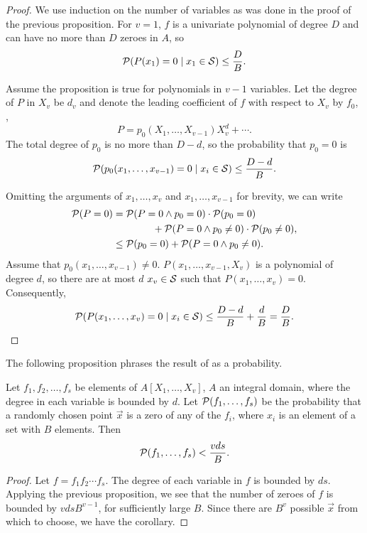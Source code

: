 \begin{proof}
We use induction on the number of variables as was done in the proof
of the previous proposition.  For $v= 1$, $f$ is a univariate
polynomial of degree $D$ and can have no more than $D$ zeroes in $A$,
so 
\[
{\cal P}(P(x_1)=0 \mid x_1 \in {\cal S}) \le \frac{D}{B}.
\]

Assume the proposition is true for polynomials in $v-1$ variables.
Let the degree of $P$ in $X_v$ be $d_v$ and denote the leading
coefficient of $f$ with respect to $X_v$ by $f_0$, \ie,
\[
P = p_0(X_1, \ldots, X_{v-1}) X_v^d + \cdots.
\]
The total degree of $p_0$ is no more than $D - d$, so the probability
that $p_0 = 0$ is
\[
{\cal P}(p_0(x_1, \ldots, x_{v-1})=0 \mid x_i \in {\cal S}) \le \frac{D-d}{B}.
\]

Omitting the arguments of $x_1, \ldots, x_v$ and $x_1, \ldots,
x_{v-1}$ for brevity, we can write
\[
\begin{aligned}
{\cal P}(P =0) &= 
  {\cal P}(P =0 \wedge p_0=0) \cdot {\cal P}(p_0=0) \\
  & \qquad \qquad+
  {\cal P}(P=0 \wedge p_0\not=0) \cdot {\cal P}(p_0\not=0), \\
   & \le {\cal P}(p_0=0) + {\cal P}(P=0 \wedge p_0\not=0).
\end{aligned}
\]
Assume that $p_0(x_1, \ldots, x_{v-1})\not=0$. $P(x_1, \ldots,
x_{v-1}, X_v)$ is a polynomial of degree $d$, so there are at most $d$
$x_v \in {\cal S}$ such that $P(x_1, \ldots, x_v) = 0$. Consequently,
\[
{\cal P}(P(x_1, \ldots, x_{v})=0 \mid x_i \in {\cal S}) \le \frac{D -
d}{B} + \frac{d}{B} = \frac{D}{B}.
\]
\end{proof}


The following proposition phrases the result of
 as a probability.

\begin{proposition} \label{Zero:MPoly:Prop}
Let $f_1, f_2, \ldots, f_s$ be elements of $A[X_1, \ldots, X_v]$, $A$
an integral domain, where the degree in each variable is bounded by
$d$.  Let ${\cal P}(f_1, \ldots, f_s)$ be the probability that a
randomly chosen point $\vec{x}$ is a zero of any of the $f_i$, where
$x_i$ is an element of a set with $B$ elements.  Then
\[
{\cal P}(f_1, \ldots, f_s) < \frac{vds}{B}.
\]
\end{proposition}

\begin{proof}
Let $f = f_1 f_2 \cdots f_s$.  The degree of each variable in $f$ is
bounded by $ds$.  Applying the previous proposition, we see that the
number of zeroes of $f$ is bounded by $vdsB^{v-1}$, for sufficiently
large $B$.  Since there are $B^v$ possible $\vec{x}$ from which to
choose, we have the corollary.
\end{proof}

